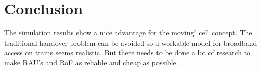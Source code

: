 \documentclass[twocolumn]{phdsymp} %
\begin{document}
\section{Conclusion}
The simulation results show a nice advantage for the moving² cell\cite{six2015multimodal} concept.  The traditional handover problem can be avoided so a workable model for broadband access on trains seems realistic.  But there needs to be done a lot of research to make RAU's and RoF as reliable and cheap as possible.



\end{document}
